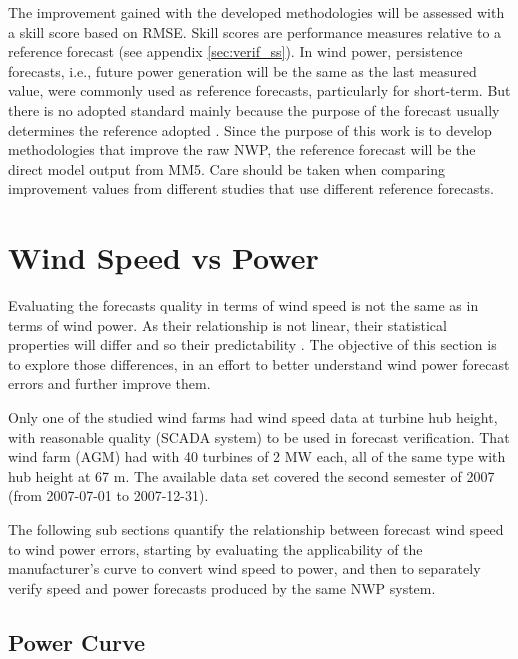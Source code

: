 The improvement gained with the developed methodologies will be assessed with a skill score based on RMSE. Skill scores are performance measures relative to a reference forecast (see appendix \ref{sec:verif_ss}). In wind power, persistence forecasts, i.e., future power generation will be the same as the last measured value, were commonly used as reference forecasts, particularly for short-term. But there is no adopted standard mainly because the purpose of the forecast usually determines the reference adopted \citep{Madsen2004, Costa2008}. Since the purpose of this work is to develop methodologies that improve the raw NWP, the reference forecast will be the direct model output from MM5. Care should be taken when comparing improvement values from different studies that use different reference forecasts.

\FloatBarrier
\section{Wind Speed vs Power}
\label{sec:ws_wp}

Evaluating the forecasts quality in terms of wind speed is not the same as in terms of wind power. As their relationship is not linear, their statistical properties will differ and so their predictability \citep{Lange2005}. The objective of this section is to explore those differences, in an effort to better understand wind power forecast errors and further improve them. 

Only one of the studied wind farms had wind speed data at turbine hub height, with reasonable quality (SCADA system) to be used in forecast verification. That wind farm (AGM) had with 40 turbines of 2 MW each, all of the same type with hub height at 67 m.  The available data set covered the second semester of 2007 (from 2007-07-01 to 2007-12-31). 

The following sub sections quantify the relationship between forecast wind speed to wind power errors, starting by evaluating the applicability of the manufacturer's curve to convert wind speed to power, and then to separately verify speed and power forecasts produced by the same NWP system.


\FloatBarrier
\subsection{Power Curve}
\label{sec:power_curve}

